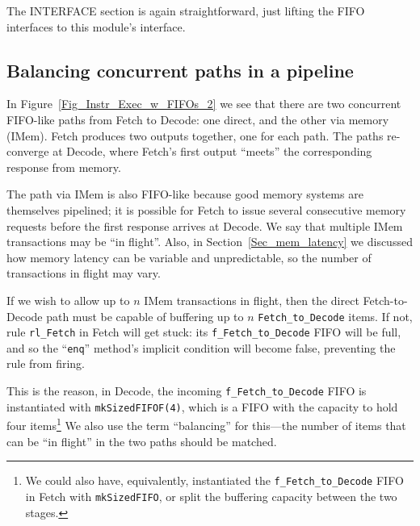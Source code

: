 The INTERFACE section is again straightforward, just lifting the FIFO
interfaces to this module's interface.


\subsection{Balancing concurrent paths in a pipeline}

\label{Sec_Balancing}


In Figure~\ref{Fig_Instr_Exec_w_FIFOs_2} we see that there are two
concurrent FIFO-like paths from Fetch to Decode: one direct, and the
other via memory (IMem).  Fetch produces two outputs together, one for
each path.  The paths re-converge at Decode, where Fetch's first
output ``meets'' the corresponding response from memory.


The path via IMem is also FIFO-like because good memory systems are
themselves pipelined; it is possible for Fetch to issue several
consecutive memory requests before the first response arrives at
Decode.  We say that multiple IMem transactions may be ``in flight''.
Also, in Section~\ref{Sec_mem_latency} we discussed how memory latency
can be variable and unpredictable, so the number of transactions in
flight may vary.

If we wish to allow up to $n$ IMem transactions in flight, then the
direct Fetch-to-Decode path must be capable of buffering up to $n$
\verb|Fetch_to_Decode| items.  If not, rule \verb|rl_Fetch| in Fetch
will get stuck: its \verb|f_Fetch_to_Decode| FIFO will be full, and so
the ``\verb|enq|'' method's implicit condition will become false,
preventing the rule from firing.

This is the reason, in Decode, the incoming \verb|f_Fetch_to_Decode|
FIFO is instantiated with \verb|mkSizedFIFOF(4)|, which is a FIFO with
the capacity to hold four items\footnote{We could also have,
equivalently, instantiated the {\tt f\_Fetch\_to\_Decode} FIFO in
Fetch with {\tt mkSizedFIFO}, or split the buffering capacity between
the two stages.}  We also use the term ``balancing'' for this---the
number of items that can be ``in flight'' in the two paths should be
matched.

